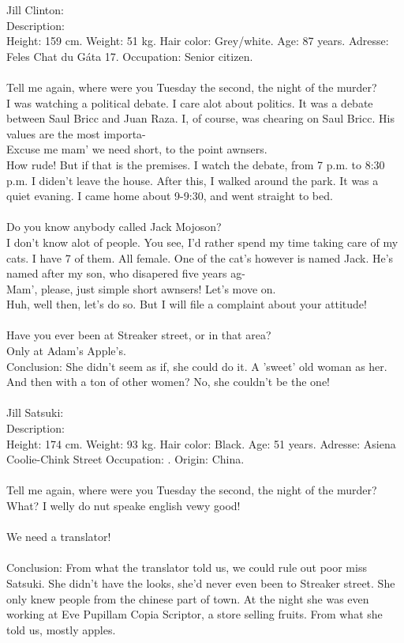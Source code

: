 \documentclass[]{article}
\begin{document}
Jill Clinton: \\
Description: \\ Height: 159 cm. Weight: 51 kg. Hair color: Grey/white. Age: 87 years. Adresse: Feles Chat du Gáta 17.  Occupation: Senior citizen.
\\ \\
Tell me again, where were you Tuesday the second, the night of the murder? \\
I was watching a political debate. I care alot about politics. It was a debate between Saul Bricc and Juan Raza. I, of course, was chearing on Saul Bricc. His values are the most importa- \\
Excuse me mam' we need short, to the point awnsers. \\
How rude! But if that is the premises. I watch the debate, from 7 p.m. to 8:30 p.m. I diden't leave the house. After this, I walked around the park. It was a quiet evaning. I came home about 9-9:30, and went straight to bed.
\\ \\
Do you know anybody called Jack Mojoson? \\
I don't know alot of people. You see, I'd rather spend my time taking care of my cats. I have 7 of them. All female. One of the cat's however is named Jack. He's named after my son, who disapered five years ag- \\
Mam', please, just simple short awnsers! Let's move on. \\
Huh, well then, let's do so. But I will file a complaint about your attitude!
\\ \\
Have you ever been at Streaker street, or in that area? \\
Only at Adam's Apple's. 
\\
Conclusion: She didn't seem as if, she could do it. A 'sweet' old woman as her. And then with a ton of other women? No, she couldn't be the one!
\\ \\



Jill Satsuki: \\
Description: \\ Height: 174 cm. Weight: 93 kg. Hair color: Black. Age: 51 years. Adresse: Asiena Coolie-Chink Street  Occupation: . Origin: China.
\\ \\
Tell me again, where were you Tuesday the second, the night of the murder? \\
What? I welly do nut speake english vewy good! \\ \\
We need a translator! \\ \\
Conclusion: From what the translator told us, we could rule out poor miss Satsuki. She didn't have the looks, she'd never even been to Streaker street. She only knew people from the chinese part of town. At the night she was even working at Eve Pupillam Copia Scriptor, a store selling fruits. From what she told us, mostly apples.
\\ \\
\end{document}
